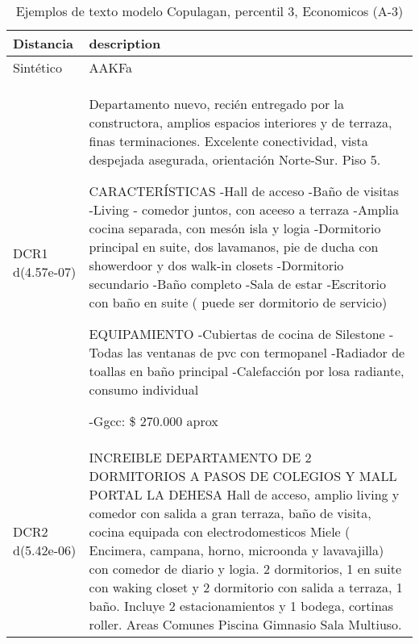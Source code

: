 \begin{table}[H]
\centering
\fontsize{10}{14}\selectfont
\caption{Ejemplos de texto modelo Copulagan, percentil 3, Economicos (A-3)}
\label{table-example-economicos-a-3-copulagan-3p-text}
\begin{tabular}{|l|m{35em}|}
\hline
\rowcolor[gray]{0.8}
Distancia & description \\
\hline Sintético & AAKFa \\
\hline DCR1 d(4.57e-07) & Departamento nuevo, reci\'en entregado por la constructora, amplios espacios interiores y de terraza, finas terminaciones. 
Excelente conectividad, vista despejada asegurada, orientaci\'on Norte-Sur. Piso 5. 

CARACTER\'ISTICAS
-Hall de acceso
-Ba\~no de visitas
-Living - comedor juntos, con aceeso a terraza
-Amplia cocina separada, con mes\'on isla y logia
-Dormitorio principal en suite, dos lavamanos, pie de ducha con showerdoor y  dos walk-in closets
-Dormitorio secundario 
-Ba\~no completo
-Sala de estar 
-Escritorio con ba\~no en suite ( puede ser dormitorio de servicio) 

EQUIPAMIENTO
-Cubiertas de cocina de Silestone 
-Todas las ventanas de pvc con termopanel
-Radiador de toallas en ba\~no principal
-Calefacci\'on por losa radiante, consumo individual 

-Ggcc: \$ 270.000 aprox \\
\hline DCR2 d(5.42e-06) & INCREIBLE DEPARTAMENTO DE 2 DORMITORIOS A PASOS DE COLEGIOS Y MALL PORTAL LA DEHESA  Hall de acceso, amplio living y comedor con salida a gran terraza, ba\~no de visita, cocina equipada con electrodomesticos Miele ( Encimera, campana, horno, microonda y lavavajilla) con comedor de diario y logia. 2 dormitorios, 1 en suite con waking closet y 2 dormitorio con salida a terraza, 1 ba\~no. Incluye 2 estacionamientos y 1 bodega, cortinas roller.   Areas Comunes Piscina Gimnasio Sala Multiuso. \\
\hline
\end{tabular}
\end{table}
